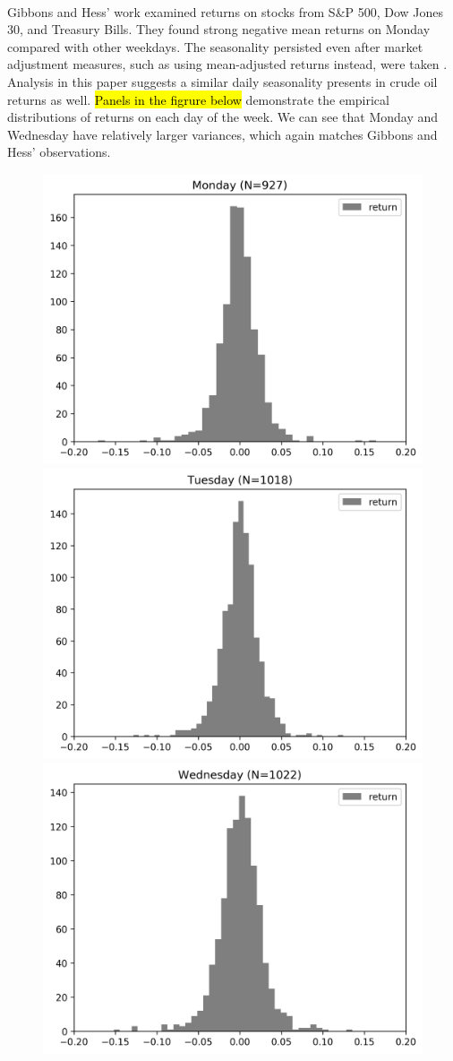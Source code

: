 \documentclass[12pt]{article}
\begin{document}
	\paragraph{} Gibbons and Hess' work examined returns on stocks from S\&P 500, Dow Jones 30, and Treasury Bills. They found strong negative mean returns on Monday compared with other weekdays. The seasonality persisted even after market adjustment measures, such as using mean-adjusted returns instead, were taken \cite{Hess1981}. Analysis in this paper suggests a similar daily seasonality presents in crude oil returns as well.
	\hl{Panels in the figrure below} demonstrate the empirical distributions of returns on each day of the week. We can see that Monday and Wednesday have relatively larger variances, which again matches Gibbons and Hess' observations.
	\begin{figure}[H]
		\centering
		\small
		\includegraphics[width=0.45\linewidth]{figures/day_of_week_effect/dist_returns_Monday.png}
		\includegraphics[width=0.45\linewidth]{figures/day_of_week_effect/dist_returns_Tuesday.png}
		\includegraphics[width=0.45\linewidth]{figures/day_of_week_effect/dist_returns_Wednesday.png}

\end{figure}
\end{document}

